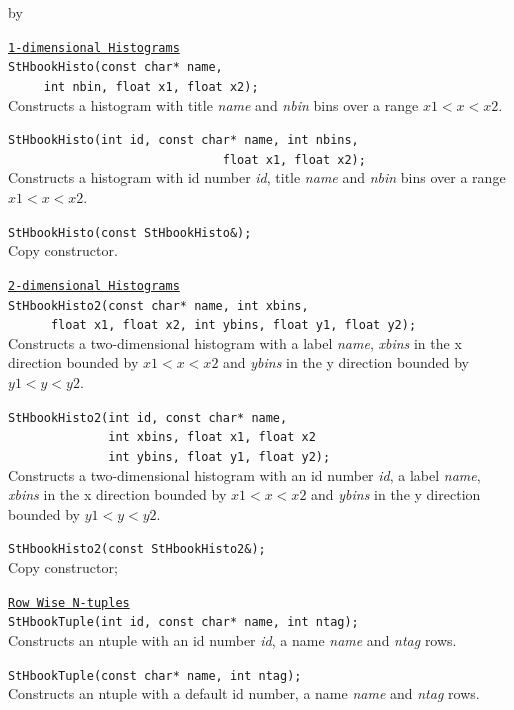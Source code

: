 \documentclass[twoside]{article}
\newcommand{\comp}[1]{\texttt{#1}}%
\newcommand{\entrylabel}[1]{\mbox{\textbf{{#1}}}\hfil}%
\newenvironment{entry}
{\begin{list}{}%
    {\renewcommand{\makelabel}{\entrylabel}%
     \setlength{\labelwidth}{90pt}%
     \setlength{\leftmargin}{\labelwidth}
     \advance\leftmargin by \labelsep%
      }%
    }%
  {\end{list}}
\newcommand{\Entrylabel}[1]%
{\raisebox{0pt}[1ex][0pt]{\makebox[\labelwidth][l]%
    {\parbox[t]{\labelwidth}{\hspace{0pt}\textbf{{#1}}}}}}
\newenvironment{Entry}%
{\renewcommand{\entrylabel}{\Entrylabel}\begin{entry}}%
  {\end{entry}}
\begin{document}
\begin{description}
\begin{Entry}
  \comp{\underline{1-dimensional Histograms}} \\
  \verb+StHbookHisto(const char* name, +\\
  \verb+     int nbin, float x1, float x2);+ \\
  Constructs a histogram with title {\em name} and {\em nbin} bins over
  a range $x1 < x < x2$.

  \verb+StHbookHisto(int id, const char* name, int nbins,+\\
  \verb+                              float x1, float x2);+ \\
  Constructs a histogram with id number {\em id}, title {\em name}
  and {\em nbin} bins over a range $x1 < x < x2$.

  \verb+StHbookHisto(const StHbookHisto&);+\\
  Copy constructor.


  \comp{\underline{2-dimensional Histograms}} \\
  \verb+StHbookHisto2(const char* name, int xbins,+\\
  \verb+      float x1, float x2, int ybins, float y1, float y2);+ \\
  Constructs a two-dimensional histogram with a label {\em name},
  {\em xbins} in the x direction bounded by $x1 < x < x2$ and
  {\em ybins} in the y direction bounded by $y1 < y < y2$.

  \verb+StHbookHisto2(int id, const char* name, +\\
  \verb+              int xbins, float x1, float x2 +\\
  \verb+              int ybins, float y1, float y2); +\\
  Constructs a two-dimensional histogram with an id number {\em id},
  a label {\em name},
  {\em xbins} in the x direction bounded by $x1 < x < x2$ and
  {\em ybins} in the y direction bounded by $y1 < y < y2$.

  \verb+StHbookHisto2(const StHbookHisto2&);+\\
  Copy constructor;
  
  \comp{\underline{Row Wise N-tuples}} \\
  \verb+StHbookTuple(int id, const char* name, int ntag);+\\
  Constructs an ntuple with an id number {\em id}, a name {\em name}
  and {\em ntag} rows.
  
  \verb+StHbookTuple(const char* name, int ntag);+\\
  Constructs an ntuple with a default id number, a name {\em name}
  and {\em ntag} rows.
  

\end{Entry}
\end{description}
\end{document}
